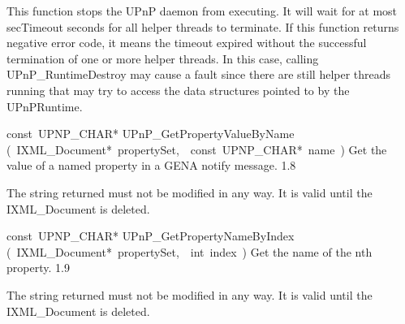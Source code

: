 \documentclass{article}
\begin{document}
\begin{cxxentry}
\begin{cxxfunction}
\begin{cxxdoc}
This function stops the UPnP daemon from executing.  It will wait
for at most secTimeout seconds for all helper threads to terminate.
If this function returns negative error code, it means the timeout
expired without the successful termination of one or more helper
threads.  In this case, calling UPnP\_RuntimeDestroy may cause a fault
since there are still helper threads running that may try to access
the data structures pointed to by the UPnPRuntime.


\end{cxxdoc}
\end{cxxfunction}
\begin{cxxfunction}
{const\ UPNP\_CHAR*}
        {UPnP\_GetPropertyValueByName}
        {(\ IXML\_Document*\ propertySet,\ \ const\ UPNP\_CHAR*\ name\ )}
        {Get the value of a named property in a GENA notify message. }
        {1.8}
\begin{cxxdoc}

The string returned must not be modified in any way.  It is valid until
the IXML\_Document is deleted.


\end{cxxdoc}
\end{cxxfunction}
\begin{cxxfunction}
{const\ UPNP\_CHAR*}
        {UPnP\_GetPropertyNameByIndex}
        {(\ IXML\_Document*\ propertySet,\ \ int\ index\ )}
        {Get the name of the nth property. }
        {1.9}
\begin{cxxdoc}

The string returned must not be modified in any way.  It is valid until
the IXML\_Document is deleted.



\end{cxxdoc}
\end{cxxfunction}
\end{cxxentry}
\end{document}
